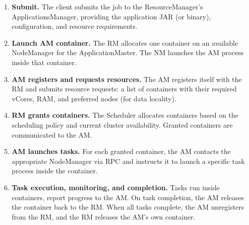 \begin{enumerate}
  \item \textbf{Submit.} The client submits the job to the
        ResourceManager's ApplicationsManager, providing the application
        JAR (or binary), configuration, and resource requirements.

  \item \textbf{Launch AM container.} The RM allocates one container on
        an available NodeManager for the ApplicationMaster. The NM
        launches the AM process inside that container.

  \item \textbf{AM registers and requests resources.} The AM registers
        itself with the RM and submits resource requests: a list of
        containers with their required vCores, RAM, and preferred nodes
        (for data locality).

  \item \textbf{RM grants containers.} The Scheduler allocates containers
        based on the scheduling policy and current cluster availability.
        Granted containers are communicated to the AM.

  \item \textbf{AM launches tasks.} For each granted container, the AM
        contacts the appropriate NodeManager via RPC and instructs it to
        launch a specific task process inside the container.

  \item \textbf{Task execution, monitoring, and completion.} Tasks run
        inside containers, report progress to the AM. On task completion,
        the AM releases the container back to the RM. When all tasks
        complete, the AM unregisters from the RM, and the RM releases
        the AM's own container.
\end{enumerate}

